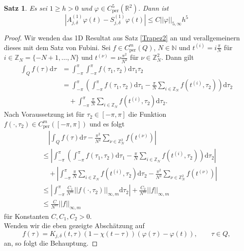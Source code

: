 \documentclass[12pt,a4paper]{scrartcl}
\newtheorem{Satz}{Satz}[section]
\newcommand{\dd}{\mathrm{d}}
\numberwithin{equation}{section}
\newcommand{\R}{\mathbb{R}} %
\newcommand{\Z}{\mathbb{Z}} %
\newcommand{\N}{\mathbb{N}} %
\newcommand{\per}{\operatorname{per}}
\begin{document}
\begin{Satz} \label{SDiskeps2}
Es sei $ 1 \geq h>0$ und $\varphi \in C_{\per}^{5}(\R^2)$. Dann ist
\[
|A^{(1)}_{j,\delta}\varphi(t) - S^{(1)}_{j,\delta}\varphi(t)| \leq C ||\varphi||_{5,\infty} h^5
\]
\end{Satz}
\begin{proof}
Wir wenden das 1D Resultat aus Satz \ref{Trapez2} an und verallgemeinern dieses mit dem Satz von Fubini.
Sei $f \in C_{\per}^m(Q)$, $N \in \N$ und $t^{(i)}= i\frac{\pi}{N}$ für $i \in \Z_N= \{-N+1, \dots, N \}$ und $t^{(\nu)}=\nu \frac{\pi^2}{N^2}$ für $\nu \in \Z_N^2$. Dann gilt
\begin{align*}
\int_Q f(\tau)\dd \tau 
&= \int_{-\pi}^\pi \int_{-\pi}^\pi f(\tau_1,\tau_2) \dd \tau_1 \tau_2 \\
&= \int_{-\pi}^\pi \left( \int_{-\pi}^\pi f(\tau_1,\tau_2) \dd \tau_1 - \frac{\pi}{N} \sum_{i \in \Z_N} f(t^{(i)},\tau_2) \right) \dd \tau_2  \\
& \quad + \int_{-\pi}^\pi \frac{\pi}{N} \sum_{i \in \Z_N} f(t^{(i)},\tau_2) \dd \tau_2.
\end{align*} 
Nach Voraussetzung ist für $\tau_2 \in [-\pi,\pi]$ die Funktion $f(\cdot,\tau_2) \in C_{\per}^m([-\pi,\pi])$ und es folgt 
\begin{align*}
&\quad \left|\int_Q f(\tau)\dd \tau - \frac{\pi^2}{N^2} \sum_{\nu \in \Z_N^2} f(t^{(\nu)})\right| \\
&\leq \left|\int_{-\pi}^\pi \left( \int_{-\pi}^\pi f(\tau_1,\tau_2) \dd \tau_1 - \frac{\pi}{N} \sum_{i \in \Z_N} f(t^{(i)},\tau_2) \right) \dd \tau_2 \right| \\
& \quad + \left|\int_{-\pi}^\pi \frac{\pi}{N} \sum_{i \in \Z_N} f(t^{(i)},\tau_2) \dd \tau_2 - \frac{\pi^2}{N^2} \sum_{\nu \in \Z_N^2} f(t^{(\nu)}) \right| \\
& \leq \left|\int_{-\pi}^\pi \frac{C_1}{N^m}||f(\cdot,\tau_2)||_{\infty,m} \dd \tau_2 \right| +  \frac{C_2}{N^m}||f||_{\infty,m} \\
& \leq \frac{C}{N^m}||f||_{\infty,m}
\end{align*}
für Konstanten $C,C_1,C_2>0$.\\
Wenden wir die eben gezeigte Abschätzung auf 
\[
f(\tau)= K_{j,\delta}(t,\tau)(1-\chi(t-\tau)) \left(\varphi(\tau)- \varphi(t)\right), \qquad \tau \in Q,
\] an, so folgt die Behauptung.





\end{proof}
\end{document}

